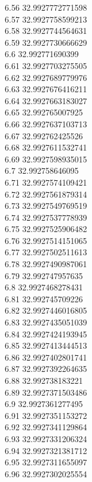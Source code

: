 {6.56	32.9927772771598\\
6.57	32.9927758599213\\
6.58	32.9927744564631\\
6.59	32.9927730666629\\
6.6	32.992771690399\\
6.61	32.9927703275505\\
6.62	32.9927689779976\\
6.63	32.9927676416211\\
6.64	32.9927663183027\\
6.65	32.992765007925\\
6.66	32.9927637103713\\
6.67	32.992762425526\\
6.68	32.9927611532741\\
6.69	32.9927598935015\\
6.7	32.992758646095\\
6.71	32.9927574109421\\
6.72	32.9927561879314\\
6.73	32.9927549769519\\
6.74	32.9927537778939\\
6.75	32.9927525906482\\
6.76	32.9927514151065\\
6.77	32.9927502511613\\
6.78	32.9927490987061\\
6.79	32.992747957635\\
6.8	32.9927468278431\\
6.81	32.992745709226\\
6.82	32.9927446016805\\
6.83	32.9927435051039\\
6.84	32.9927424193945\\
6.85	32.9927413444513\\
6.86	32.9927402801741\\
6.87	32.9927392264635\\
6.88	32.992738183221\\
6.89	32.9927371503486\\
6.9	32.9927361277495\\
6.91	32.9927351153272\\
6.92	32.9927341129864\\
6.93	32.9927331206324\\
6.94	32.9927321381712\\
6.95	32.9927311655097\\
6.96	32.9927302025554\\
}
